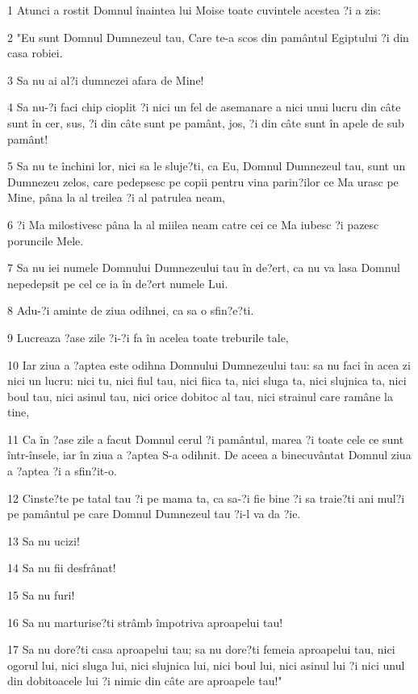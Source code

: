 \par 1 Atunci a rostit Domnul înaintea lui Moise toate cuvintele acestea ?i a zis:
\par 2 "Eu sunt Domnul Dumnezeul tau, Care te-a scos din pamântul Egiptului ?i din casa robiei.
\par 3 Sa nu ai al?i dumnezei afara de Mine!
\par 4 Sa nu-?i faci chip cioplit ?i nici un fel de asemanare a nici unui lucru din câte sunt în cer, sus, ?i din câte sunt pe pamânt, jos, ?i din câte sunt în apele de sub pamânt!
\par 5 Sa nu te închini lor, nici sa le sluje?ti, ca Eu, Domnul Dumnezeul tau, sunt un Dumnezeu zelos, care pedepsesc pe copii pentru vina parin?ilor ce Ma urasc pe Mine, pâna la al treilea ?i al patrulea neam,
\par 6 ?i Ma milostivesc pâna la al miilea neam catre cei ce Ma iubesc ?i pazesc poruncile Mele.
\par 7 Sa nu iei numele Domnului Dumnezeului tau în de?ert, ca nu va lasa Domnul nepedepsit pe cel ce ia în de?ert numele Lui.
\par 8 Adu-?i aminte de ziua odihnei, ca sa o sfin?e?ti.
\par 9 Lucreaza ?ase zile ?i-?i fa în acelea toate treburile tale,
\par 10 Iar ziua a ?aptea este odihna Domnului Dumnezeului tau: sa nu faci în acea zi nici un lucru: nici tu, nici fiul tau, nici fiica ta, nici sluga ta, nici slujnica ta, nici boul tau, nici asinul tau, nici orice dobitoc al tau, nici strainul care ramâne la tine,
\par 11 Ca în ?ase zile a facut Domnul cerul ?i pamântul, marea ?i toate cele ce sunt într-însele, iar în ziua a ?aptea S-a odihnit. De aceea a binecuvântat Domnul ziua a ?aptea ?i a sfin?it-o.
\par 12 Cinste?te pe tatal tau ?i pe mama ta, ca sa-?i fie bine ?i sa traie?ti ani mul?i pe pamântul pe care Domnul Dumnezeul tau ?i-l va da ?ie.
\par 13 Sa nu ucizi!
\par 14 Sa nu fii desfrânat!
\par 15 Sa nu furi!
\par 16 Sa nu marturise?ti strâmb împotriva aproapelui tau!
\par 17 Sa nu dore?ti casa aproapelui tau; sa nu dore?ti femeia aproapelui tau, nici ogorul lui, nici sluga lui, nici slujnica lui, nici boul lui, nici asinul lui ?i nici unul din dobitoacele lui ?i nimic din câte are aproapele tau!"
